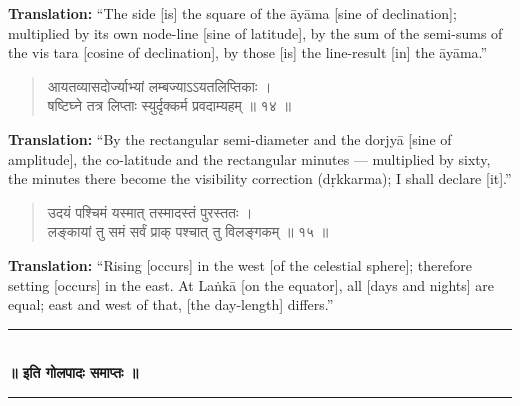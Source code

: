 \documentclass[11pt,a4paper]{article}
\newcommand{\dev}[1]{{\devanagarifont #1}}
\newenvironment{sanskritverse}{\begin{verse}\devanagarifont\large\centering}{\end{verse}}
\begin{document}
\vspace{0.3cm}
\noindent\textbf{Translation:} ``The side [is] the square of the āyāma [sine of declination]; multiplied by its own node-line [sine of latitude], by the sum of the semi-sums of the vis tara [cosine of declination], by those [is] the line-result [in] the āyāma.''

\vspace{0.5cm}

\begin{tcolorbox}[colback=white,colframe=rulecolor,title={\dev{\textbf{गोल १४ — दृक्कर्म (Visibility Corrections)}}}]
\begin{sanskritverse}
\dev{आयतव्यासदोर्ज्याभ्यां लम्बज्याऽऽयतलिप्तिकाः ।\\
षष्टिघ्ने तत्र लिप्ताः स्युर्दृक्कर्म प्रवदाम्यहम् ॥ १४ ॥}
\end{sanskritverse}
\end{tcolorbox}

\vspace{0.3cm}
\noindent\textbf{Translation:} ``By the rectangular semi-diameter and the dorjyā [sine of amplitude], the co-latitude and the rectangular minutes --- multiplied by sixty, the minutes there become the visibility correction (dṛkkarma); I shall declare [it].''

\vspace{0.5cm}

\begin{tcolorbox}[colback=white,colframe=rulecolor,title={\dev{\textbf{गोल १५ — उदयास्तमयाः (Rising and Setting)}}}]
\begin{sanskritverse}
\dev{उदयं पश्चिमं यस्मात् तस्मादस्तं पुरस्ततः ।\\
लङ्कायां तु समं सर्वं प्राक् पश्चात् तु विलङ्गकम् ॥ १५ ॥}
\end{sanskritverse}
\end{tcolorbox}

\vspace{0.3cm}
\noindent\textbf{Translation:} ``Rising [occurs] in the west [of the celestial sphere]; therefore setting [occurs] in the east. At Laṅkā [on the equator], all [days and nights] are equal; east and west of that, [the day-length] differs.''

\vspace{0.5cm}

\begin{center}
\textcolor{rulecolor}{\rule{0.6\textwidth}{0.4pt}}\\[0.5em]
\textbf{\dev{॥ इति गोलपादः समाप्तः ॥}}\\[0.3em]
\textcolor{rulecolor}{\rule{0.6\textwidth}{0.4pt}}
\end{center}
\end{document}
